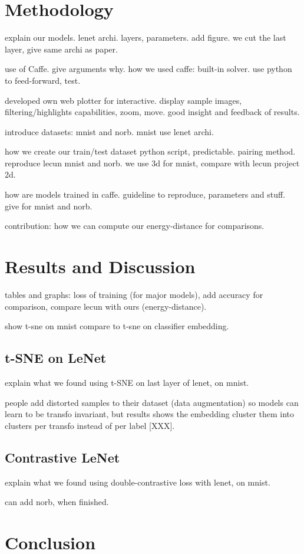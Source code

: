 \documentclass[a4paper,12pt]{report}
\begin{document}
\chapter{Methodology}

explain our models.
lenet archi.
layers, parameters.
add figure.
we cut the last layer, give same archi as paper.

use of Caffe.
give arguments why.
how we used caffe: built-in solver.
use python to feed-forward, test.

developed own web plotter for interactive.
display sample images, filtering/highlights capabilities, zoom, move.
good insight and feedback of results.

introduce datasets: mnist and norb.
mnist use lenet archi.

how we create our train/test dataset
python script, predictable.
pairing method.
reproduce lecun mnist and norb.
we use 3d for mnist, compare with lecun project 2d.

how are models trained in caffe.
guideline to reproduce, parameters and stuff.
give for mnist and norb.

contribution: how we can compute our energy-distance for comparisons.


\chapter{Results and Discussion}

tables and graphs: loss of training (for major models), add accuracy for comparison, compare lecun with ours (energy-distance).

show t-sne on mnist
compare to t-sne on classifier embedding.

\section{t-SNE on LeNet}
explain what we found using t-SNE on last layer of lenet, on mnist.

people add distorted samples to their dataset (data augmentation) so models can learn to be transfo invariant, but results shows the embedding cluster them into clusters per transfo instead of per label [XXX].

\section{Contrastive LeNet}
explain what we found using double-contrastive loss with lenet, on mnist.

can add norb, when finished.


\chapter{Conclusion}

{}


\nocite{lecun2004learning}
\end{document}
